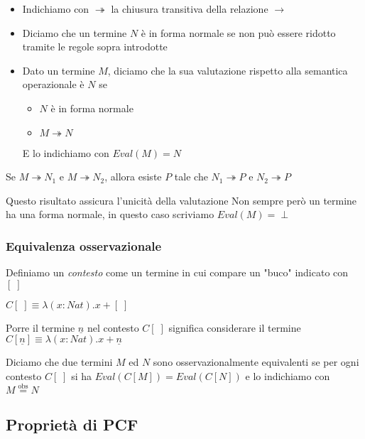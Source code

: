 \documentclass{beamer}
\newcommand{\eqobs}{\stackrel{\text{obs}}{=}}
\begin{document}
\begin{frame}
	\begin{itemize}
		\item Indichiamo con $\twoheadrightarrow$ la chiusura transitiva della relazione $\rightarrow$
		\item Diciamo che un termine $N$ è in forma normale se non può essere ridotto tramite le regole sopra introdotte
		\item Dato un termine $M$, diciamo che la sua valutazione rispetto alla semantica operazionale è $N$ se
		\begin{itemize}
			\item $N$ è in forma normale
			\item $M \twoheadrightarrow N$
		\end{itemize}
		E lo indichiamo con $Eval(M)=N$
	\end{itemize}
	
	\begin{theorem}
		Se $M \twoheadrightarrow N_1$ e $M \twoheadrightarrow N_2$, allora esiste $P$ tale che $N_1 \twoheadrightarrow P$ e $N_2 \twoheadrightarrow P$
	\end{theorem}
	
	Questo risultato assicura l'unicità della valutazione
	Non sempre però un termine ha una forma normale, in questo caso scriviamo $Eval(M)=\perp$
	
\end{frame}


\begin{frame}
	
	\frametitle{Equivalenza osservazionale}
	
	Definiamo un \emph{contesto} come un termine in cui compare un "buco" indicato con $[\;]$
	
	\begin{example}
		$C[\;] \equiv \lambda (x:Nat).x+[\;]$
		
		Porre il termine $\underline{n}$ nel contesto $C[\;]$ significa considerare il termine
		$C[\underline{n}] \equiv \lambda (x:Nat).x+\underline{n}$
	\end{example}
	
	Diciamo che due termini $M$ ed $N$ sono osservazionalmente equivalenti se per ogni contesto $C[\;]$ si ha $Eval(C[M])=Eval(C[N])$
	e lo indichiamo con $M\eqobs N$
	
\end{frame}




\subsection{Proprietà di PCF}
\end{document}

